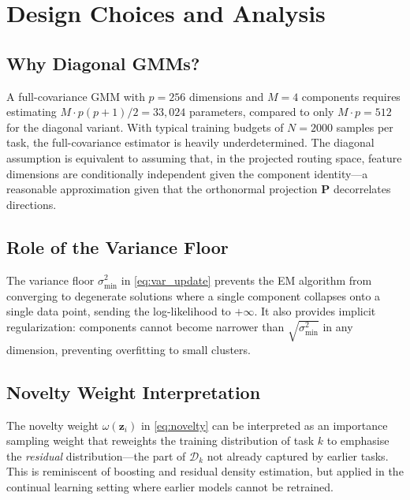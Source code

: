 \documentclass[12pt,a4paper]{article}
\begin{document}
\section{Design Choices and Analysis}
\label{sec:analysis}

\subsection{Why Diagonal GMMs?}

A full-covariance GMM with $p=256$ dimensions and $M=4$ components requires estimating $M \cdot p(p+1)/2 = 33{,}024$ parameters, compared to only $M \cdot p = 512$ for the diagonal variant.
With typical training budgets of $N=2000$ samples per task, the full-covariance estimator is heavily underdetermined.
The diagonal assumption is equivalent to assuming that, in the projected routing space, feature dimensions are conditionally independent given the component identity---a reasonable approximation given that the orthonormal projection $\mathbf{P}$ decorrelates directions.

\subsection{Role of the Variance Floor}

The variance floor $\sigma^2_{\min}$ in \eqref{eq:var_update} prevents the EM algorithm from converging to degenerate solutions where a single component collapses onto a single data point, sending the log-likelihood to $+\infty$.
It also provides implicit regularization: components cannot become narrower than $\sqrt{\sigma^2_{\min}}$ in any dimension, preventing overfitting to small clusters.

\subsection{Novelty Weight Interpretation}

The novelty weight $\omega(\mathbf{z}_i)$ in \eqref{eq:novelty} can be interpreted as an importance sampling weight that reweights the training distribution of task $k$ to emphasise the \emph{residual} distribution---the part of $\mathcal{D}_k$ not already captured by earlier tasks.
This is reminiscent of boosting and residual density estimation, but applied in the continual learning setting where earlier models cannot be retrained.
\end{document}
